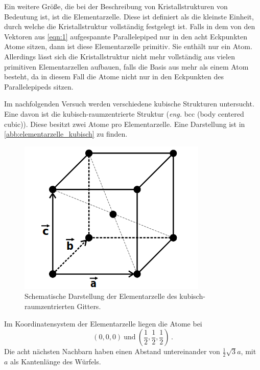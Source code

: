 Ein weitere Größe, die bei der Beschreibung von Kristallstrukturen von Bedeutung
ist, ist die Elementarzelle.  Diese ist definiert als die kleinste Einheit, durch
welche die Kristallstruktur vollständig festgelegt ist. Falls in dem von den Vektoren
aus \eqref{eqn:1} aufgespannte Parallelepiped nur in den acht Eckpunkten Atome sitzen,
dann ist diese Elementarzelle primitiv. Sie enthält nur ein Atom. Allerdings lässt sich
die Kristallstruktur nicht mehr vollständig aus vielen primitiven Elementarzellen
aufbauen, falls die Basis aus mehr als einem Atom besteht, da in diesem Fall die Atome
nicht nur in den Eckpunkten des Parallelepipeds sitzen.

Im nachfolgenden Versuch werden verschiedene kubische Strukturen untersucht.
Eine davon ist die kubisch-raumzentrierte Struktur (\textit{eng.} bcc (body centered cubic)).
Diese besitzt zwei Atome pro Elementarzelle. Eine Darstellung ist in \autoref{abb:elementarzelle_kubisch}
zu finden.
\begin{figure}
  \centering
  \includegraphics[scale=0.5]{content/pics/elementarzelle_kubisch.png}
  \caption{Schematische Darstellung der Elementarzelle des kubisch-raumzentrierten
  Gitters. \cite{anleitung}}
  \label{abb:elementarzelle_kubisch}
\end{figure}
Im Koordinatensystem der Elementarzelle liegen die Atome bei
\begin{equation}
  (0, 0, 0) \ \text{und} \ (\frac{1}{2}, \frac{1}{2}, \frac{1}{2}) \, .
  \label{eqn:atome-raumzentriert}
\end{equation}
Die acht nächsten Nachbarn haben einen Abstand untereinander von
$\frac{1}{2} \sqrt{3} a$, mit $a$ als Kantenlänge des Würfels.

